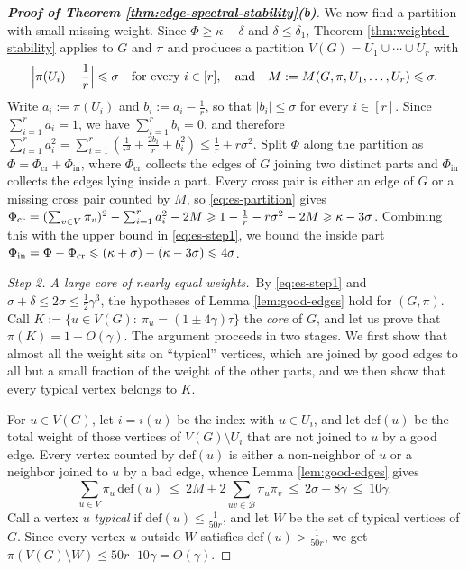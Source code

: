 \documentclass[11pt, a4paper]{article}
\theoremstyle{definition}
\theoremstyle{plain}
\renewcommand{\le}{\leqslant}
\renewcommand{\ge}{\geqslant}
\begin{document}
\begin{proof}[{\bf Proof of Theorem
\ref{thm:edge-spectral-stability}(b)}]
We now find a partition with small missing weight. 
Since $\Phi \ge \kappa -\delta$ and $\delta \le \delta_1$, Theorem
\ref{thm:weighted-stability} applies to $G$ and $\pi$ and
produces a partition $V(G)=U_1\cup \cdots \cup U_r$ with
\begin{equation}\label{eq:es-partition}
  \Bigl|\pi (U_i)-\frac1r\Bigr|\le \sigma \quad 
  \text{for every}~i\in [r],
  \quad \text{and} \quad 
  M:=M(G,\pi ,U_1,\ldots ,U_r)\le \sigma .
\end{equation} 
Write $a_i:=\pi (U_i)$ and $b_i:= a_i - \frac{1}{r} $, 
so that $|b_i| \le \sigma$ for every $i\in [r]$. Since  $\sum_{i=1}^r a_i =1$, we have $\sum_{i=1}^r b_i =0$, and therefore   
$\sum_{i=1}^r a_i^{2} = \sum_{i=1}^r (\frac{1}{r^2} + \frac{2b_i}{r} + b_i^2) \le \frac1r+r\sigma^{2}$.  
Split $\Phi$ along the partition as
$\Phi =\Phi_{\mathrm{cr}}+\Phi_{\mathrm{in}}$, where
$\Phi_{\mathrm{cr}}$ collects the edges of $G$ joining two
distinct parts and $\Phi_{\mathrm{in}}$ collects the edges
lying inside a part. Every cross pair is either an edge of
$G$ or a missing cross pair counted by $M$, so
\eqref{eq:es-partition} gives $\Phi_{\rm cr} = (\sum_{v\in V} \pi_v)^2 -\sum_{i=1}^r a_i^{2}-2M \ge 1- \frac{1}{r} - r\sigma^2 - 2M \ge \kappa - 3\sigma$. 
Combining this with the upper bound in \eqref{eq:es-step1},
we bound the inside part 
$  \Phi_{\mathrm{in}} =  \Phi - \Phi_{\rm cr} \le (\kappa + \sigma) - (\kappa -3\sigma) \le 4\sigma$. 


\smallskip\noindent
\textit{Step 2. A large core of nearly equal weights.}\
By \eqref{eq:es-step1} and
$\sigma + \delta \le 2\sigma \le \frac{1}{2} \gamma^3$, the
hypotheses of Lemma \ref{lem:good-edges} hold for $(G,\pi )$.
Call $K:=\{u\in V(G):\ \pi_u=(1\pm 4\gamma )\tau \}$ the
\emph{core} of $G$, 
and let us prove that $\pi (K)=1-O(\gamma )$.
The argument proceeds in two stages. We first show that almost all the weight sits on ``typical'' vertices, which are joined by good edges to all but a small fraction of the weight of the other parts, and we then show that every typical vertex belongs to $K$.

For $u\in V(G)$, let $i=i(u)$ be the index with $u\in U_{i}$, and let $\mathrm{def}(u)$ be the total weight of those
vertices of $V(G)\setminus U_{i}$ that are not joined to $u$ by a good edge. Every vertex counted by $\mathrm{def}(u)$ is either a non-neighbor of $u$ or a neighbor joined to $u$ by a bad edge, whence Lemma \ref{lem:good-edges} gives
\[
  \sum_{u\in V}\pi_u\,\mathrm{def} (u)
  \ \le\ 2 M+ 2 \sum_{uv\in \mathcal{B}}\! \pi_u\pi_v
  \ \le\ 2 \sigma +8\gamma \ \le\ 10\gamma .
\]
Call a vertex $u$ \emph{typical} if
$\mathrm{def}(u)\le \frac{1}{50r}$, and let $W$ be the set of
typical vertices of $G$. Since every vertex $u$ outside $W$ satisfies $\mathrm{def}(u) > \frac{1}{50r}$, we get
$\pi (V(G) \setminus W) \le 50r \cdot 10\gamma =O(\gamma)$.


\end{proof}
\end{document}
